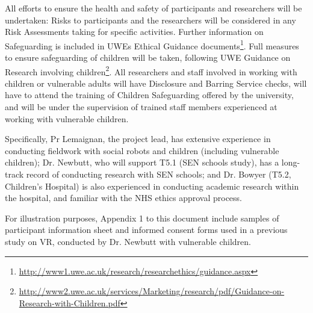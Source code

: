\documentclass[11pt,a4paper]{report}
\begin{document}
All efforts to ensure the health and safety of participants and researchers will
be undertaken: Risks to participants and the researchers will be considered in
any Risk Assessments taking for specific activities. Further information on
Safeguarding is included in UWEs Ethical Guidance
documents\footnote{\url{http://www1.uwe.ac.uk/research/researchethics/guidance.aspx}}.
Full measures to ensure safeguarding of children will be taken, following UWE
Guidance on Research involving
children\footnote{\url{http://www2.uwe.ac.uk/services/Marketing/research/pdf/Guidance-on-Research-with-Children.pdf}}.
All researchers and staff involved in working with children or vulnerable adults
will have Disclosure and Barring Service checks, will have to attend the
training of Children Safeguarding offered by the university, and will be under
the supervision of trained staff members experienced at working with vulnerable
children.

Specifically, Pr Lemaignan, the project lead, has extensive experience in
conducting fieldwork with social robots and children (including vulnerable
children); Dr. Newbutt, who will support T5.1 (SEN schools study), has a
long-track record of conducting research with SEN schools; and Dr. Bowyer (T5.2,
Children's Hospital) is also experienced in conducting academic research within
the hospital, and familiar with the NHS ethics approval process.


For illustration purposes, Appendix 1 to this document include samples of
participant information sheet and informed consent forms used in a previous
study on VR, conducted by Dr. Newbutt with vulnerable children.
\end{document}
